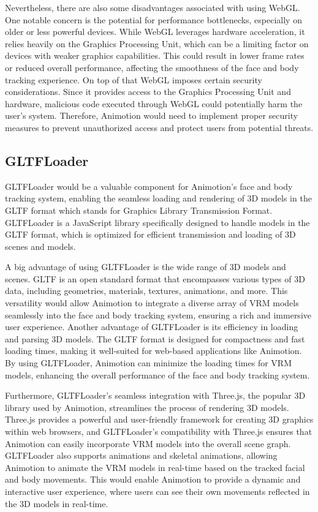 Nevertheless, there are also some disadvantages associated with using WebGL. One notable concern is the potential for performance bottlenecks, 
especially on older or less powerful devices. While WebGL leverages hardware acceleration, it relies heavily on the Graphics Processing Unit, 
which can be a limiting factor on devices with weaker graphics capabilities. This could result in lower frame rates or reduced 
overall performance, affecting the smoothness of the face and body tracking experience. 
On top of that WebGL imposes certain security considerations. Since it provides access to the Graphics Processing Unit and hardware, 
malicious code executed through WebGL could potentially harm the user's system. Therefore, 
Animotion would need to implement proper security measures to prevent unauthorized access and protect users from potential threats. \cite{WebGLSecurity}

\subsection{GLTFLoader}
GLTFLoader would be a valuable component for Animotion's face and body tracking system, enabling the seamless loading 
and rendering of 3D models in the GLTF format which stands for Graphics Library Transmission Format. GLTFLoader is a JavaScript library specifically designed to handle 
models in the GLTF format, which is optimized for efficient transmission 
and loading of 3D scenes and models. 

A big advantage of using GLTFLoader is the wide range of 3D models and scenes. 
GLTF is an open standard format that encompasses various types of 3D data, including geometries, materials, textures, 
animations, and more. This versatility would allow Animotion to integrate a diverse array of VRM models seamlessly 
into the face and body tracking system, ensuring a rich and immersive user experience.
Another advantage of GLTFLoader is its efficiency in loading and parsing 3D models. The GLTF format is designed 
for compactness and fast loading times, making it well-suited for web-based applications like Animotion. 
By using GLTFLoader, Animotion can minimize the loading times for VRM models, enhancing 
the overall performance of the face and body tracking system. \cite{GLTFLoader}

Furthermore, GLTFLoader's seamless integration with Three.js, the popular 3D library used by 
Animotion, streamlines the process of rendering 3D models. Three.js provides a powerful and user-friendly framework 
for creating 3D graphics within web browsers, and GLTFLoader's compatibility with Three.js ensures that Animotion 
can easily incorporate VRM models into the overall scene graph. GLTFLoader also supports animations and skeletal animations, allowing Animotion to animate the 
VRM models in real-time based on the tracked facial and body movements. This would enable Animotion to provide 
a dynamic and interactive user experience, where users can see their own movements reflected in the 3D models in real-time. \cite{GLTFLoaderWithVRM}

